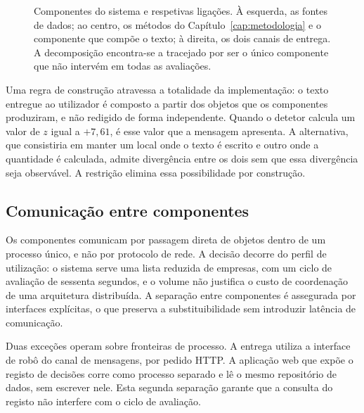 \begin{figure}[ht]
\caption[Arquitetura do InvestiGator]{Componentes do sistema e respetivas ligações. À esquerda, as
fontes de dados; ao centro, os métodos do Capítulo~\ref{cap:metodologia} e o componente que compõe
o texto; à direita, os dois canais de entrega. A decomposição encontra-se a tracejado por ser o
único componente que não intervém em todas as avaliações.}
\label{fig:sis_arquitetura}
\end{figure}

Uma regra de construção atravessa a totalidade da implementação: o texto entregue ao utilizador é
composto a partir dos objetos que os componentes produziram, e não redigido de forma independente.
Quando o detetor calcula um valor de $z$ igual a $+7{,}61$, é esse valor que a mensagem apresenta.
A alternativa, que consistiria em manter um local onde o texto é escrito e outro onde a quantidade
é calculada, admite divergência entre os dois sem que essa divergência seja observável. A
restrição elimina essa possibilidade por construção.

\subsection{Comunicação entre componentes}

Os componentes comunicam por passagem direta de objetos dentro de um processo único, e não por
protocolo de rede. A decisão decorre do perfil de utilização: o sistema serve uma lista reduzida
de empresas, com um ciclo de avaliação de sessenta segundos, e o volume não justifica o custo de
coordenação de uma arquitetura distribuída. A separação entre componentes é assegurada por
interfaces explícitas, o que preserva a substituibilidade sem introduzir latência de comunicação.

Duas exceções operam sobre fronteiras de processo. A entrega utiliza a interface de robô do canal
de mensagens, por pedido \gls{HTTP}. A aplicação web que expõe o registo de decisões corre como processo
separado e lê o mesmo repositório de dados, sem escrever nele. Esta segunda separação garante que
a consulta do registo não interfere com o ciclo de avaliação.

